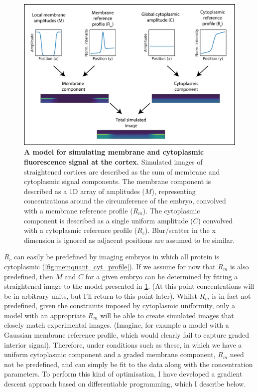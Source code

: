 \documentclass[12pt]{"report"}
\newcommand{\mycaption}[2]{\caption[#1]{\textbf{#1.} #2}}
\begin{document}
\begin{figure}
\includegraphics[scale=1.15]{memquant_model_schematic}
\centering
\mycaption{A model for simulating membrane and cytoplasmic fluorescence signal at the cortex}{
Simulated images of straightened cortices are described as the sum of membrane and cytoplasmic signal components. The membrane component is described as a 1D array of amplitudes ($M$), representing concentrations around the circumference of the embryo, convolved with a membrane reference profile ($R_m$). The cytoplasmic component is described as a single uniform amplitude ($C$) convolved with a cytoplasmic reference profile ($R_c$). Blur/scatter in the x dimension is ignored as adjacent positions are assumed to be similar.
}
\label{fig:memquant_model_schematic}
\end{figure}

$R_c$ can easily be predefined by imaging embryos in which all protein is cytoplasmic (\cref{fig:memquant_cyt_profile}). If we assume for now that $R_m$ is also predefined, then $M$ and $C$ for a given embryo can be determined by fitting a straightened image to the model presented in \cref{fig:memquant_model_schematic}. (At this point concentrations will be in arbitrary units, but I'll return to this point later). Whilst $R_m$ is in fact not predefined, given the constraints imposed by cytoplasmic uniformity, only a model with an appropriate $R_m$ will be able to create simulated images that closely match experimental images. (Imagine, for example a model with a Gaussian membrane reference profile, which would clearly fail to capture graded interior signal). Therefore, under conditions such as these, in which we have a uniform cytoplasmic component and a graded membrane component, $R_m$ need not be predefined, and can simply be fit to the data along with the concentration parameters. To perform this kind of optimisation, I have developed a gradient descent approach based on differentiable programming, which I describe below.\\
\end{document}
